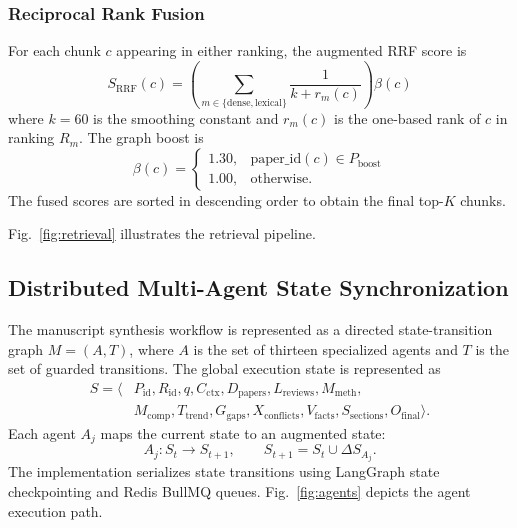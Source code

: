 \documentclass[conference]{IEEEtran}
\begin{document}
\subsubsection{Reciprocal Rank Fusion}
For each chunk $c$ appearing in either ranking, the augmented RRF score is
\begin{equation}
S_{\mathrm{RRF}}(c) = \left( \sum_{m \in \{\mathrm{dense}, \mathrm{lexical}\}} \frac{1}{k + r_m(c)} \right) \beta(c)
\label{eq:rrf}
\end{equation}
where $k = 60$ is the smoothing constant and $r_m(c)$ is the one-based rank of $c$ in ranking $R_m$. The graph boost is
\begin{equation}
\beta(c) = \begin{cases}
1.30, & \mathrm{paper\_id}(c) \in P_{\mathrm{boost}} \\
1.00, & \text{otherwise}.
\end{cases}
\label{eq:boost}
\end{equation}
The fused scores are sorted in descending order to obtain the final top-$K$ chunks.

 Fig.~\ref{fig:retrieval} illustrates the retrieval pipeline.

\subsection{Distributed Multi-Agent State Synchronization}
The manuscript synthesis workflow is represented as a directed state-transition graph $M = (A, T)$, where $A$ is the set of thirteen specialized agents and $T$ is the set of guarded transitions. The global execution state is represented as
\begin{align}
S = \langle &P_{\mathrm{id}}, R_{\mathrm{id}}, q, C_{\mathrm{ctx}}, D_{\mathrm{papers}}, L_{\mathrm{reviews}}, M_{\mathrm{meth}}, \nonumber\\
&M_{\mathrm{comp}}, T_{\mathrm{trend}}, G_{\mathrm{gaps}}, X_{\mathrm{conflicts}}, V_{\mathrm{facts}}, S_{\mathrm{sections}}, O_{\mathrm{final}}\rangle.
\label{eq:state}
\end{align}
Each agent $A_j$ maps the current state to an augmented state:
\begin{equation}
A_j: S_t \longrightarrow S_{t+1}, \qquad S_{t+1} = S_t \cup \Delta S_{A_j}.
\label{eq:transition}
\end{equation}
The implementation serializes state transitions using LangGraph state checkpointing and Redis BullMQ queues. Fig.~\ref{fig:agents} depicts the agent execution path.
\end{document}
